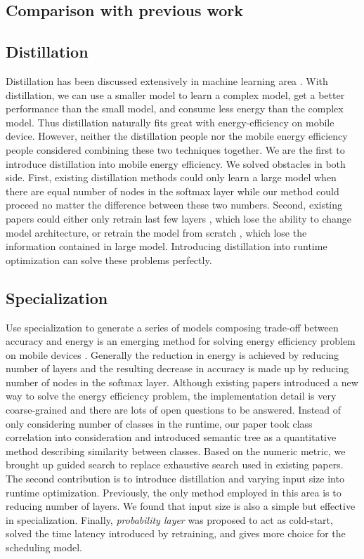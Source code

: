 \documentclass[conference]{IEEEtran}
\begin{document}
\begin{spacing}{0.9}
\section{Comparison with previous work}
\subsection{Distillation}
Distillation has been discussed extensively in machine learning area \cite{hinton2015distilling, ba2014deep, dauphin2013big, chen2017learning, lopez2015unifying, kim2015compression,bucilu2006model}. With distillation, we can use a smaller model to learn a complex model, get a better performance than the small model, and consume less energy than the complex model. Thus distillation naturally fits great with energy-efficiency on mobile device. However, neither the distillation people nor the mobile energy efficiency people considered combining these two techniques together. We are the first to introduce distillation into mobile energy efficiency. We solved obstacles in both side. First, existing distillation methods could only learn a large model when there are equal number of nodes in the softmax layer while our method could proceed no matter the difference between these two numbers. Second, existing papers could either only retrain last few layers \cite{li2015towards}, which lose the ability to change model architecture, or retrain the model from scratch \cite{han2016mcdnn, kang2017noscope, shen2017fast}, which lose the information contained in large model. Introducing distillation into runtime optimization can solve these problems perfectly.

\subsection{Specialization}
Use specialization to generate a series of models composing trade-off between accuracy and energy is an emerging method for solving energy efficiency problem on mobile devices \cite{han2016mcdnn, kang2017noscope, shen2017fast}. Generally the reduction in energy is achieved by reducing number of layers and the resulting decrease in accuracy is made up by reducing number of nodes in the softmax layer. Although existing papers introduced a new way to solve the energy efficiency problem, the implementation detail is very coarse-grained and there are lots of open questions to be answered. Instead of only considering number of classes in the runtime, our paper took class correlation into consideration and introduced semantic tree as a quantitative method describing similarity between classes. Based on the numeric metric, we brought up guided search to replace exhaustive search used in existing papers. The second contribution is to introduce distillation and varying input size into runtime optimization. Previously, the only method employed in this area is to reducing number of layers. We found that input size is also a simple but effective in specialization. Finally, \textit{probability layer} was proposed to act as cold-start, solved the time latency introduced by retraining, and gives more choice for the scheduling model.


\end{spacing}
\end{document}
